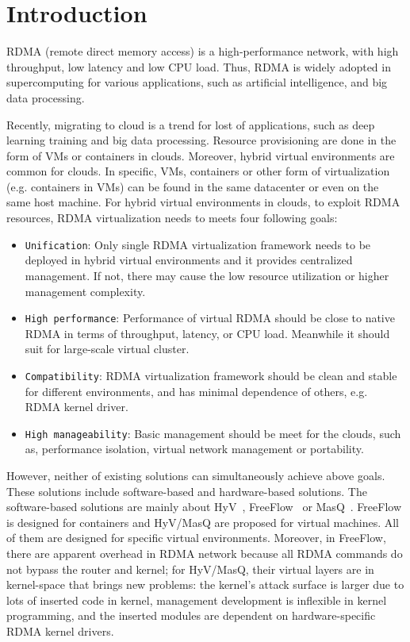 \section{Introduction}
RDMA (remote direct memory access) is a high-performance network,  with high throughput, low latency and low CPU load. Thus, RDMA is widely adopted in supercomputing for various applications,  such as artificial intelligence, and big data processing. 

Recently, migrating to cloud is a trend for lost of applications, such as deep learning training and big data processing. Resource provisioning are done in the form of VMs or containers in clouds. Moreover, hybrid virtual environments are common for clouds. In specific, VMs, containers or other form of virtualization (e.g. containers in VMs) can be found in the same datacenter or even on the same host machine. For hybrid virtual environments in clouds,  to exploit RDMA resources, RDMA virtualization needs to meets four following goals:

\begin{itemize}
	\item {\verb|Unification|}: Only single RDMA virtualization framework needs to be deployed in hybrid virtual environments and it provides centralized management. If not, there may cause the low resource utilization or higher management complexity.
	\item {\verb|High performance|}: Performance of virtual RDMA should be close to native RDMA in terms of throughput, latency, or CPU load. Meanwhile it should suit for large-scale virtual cluster.
	\item {\verb|Compatibility|}: RDMA virtualization framework should be clean and stable for different environments, and has minimal dependence of others, e.g. RDMA kernel driver.
	\item {\verb|High manageability|}: Basic management should be meet for the clouds, such as, performance isolation, virtual network management or portability.
\end{itemize}

However, neither of existing solutions can simultaneously achieve above goals. These solutions include software-based and hardware-based solutions. The software-based solutions are mainly about HyV~\cite{pfefferle2015hybrid}, FreeFlow~\cite{kim2019freeflow} or MasQ~\cite{he2020masq}. FreeFlow is  designed for containers and HyV/MasQ are proposed for virtual machines. All of them are designed for specific virtual environments. Moreover, in FreeFlow, there are apparent overhead in RDMA network because all RDMA commands do not bypass the router and kernel; for HyV/MasQ, their virtual layers are in kernel-space that brings new problems: the kernel's attack surface is larger due to lots of inserted code in kernel, management development is inflexible in kernel programming, and the inserted modules are dependent on hardware-specific RDMA kernel drivers.

